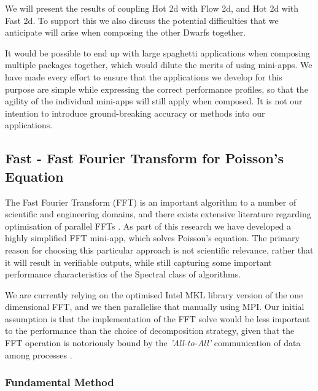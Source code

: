\documentclass[runningheads,a4paper]{llncs}
\begin{document}
We will present the results of coupling Hot 2d with Flow 2d, and Hot 2d with Fast 2d. To support this we also discuss the potential difficulties that we anticipate will arise when composing the other Dwarfs together. 

It would be possible to end up with large spaghetti applications when composing multiple packages together, which would dilute the merits of using mini-apps. We have made every effort to ensure that the applications we develop for this purpose are simple while expressing the correct performance profiles, so that the agility of the individual mini-apps will still apply when composed. It is not our intention to introduce ground-breaking accuracy or methods into our applications.

\subsection{Fast - Fast Fourier Transform for Poisson's Equation}

\label{sec:fast}

The Fast Fourier Transform (FFT) is an important algorithm to a number of scientific and engineering domains, and there exists extensive literature regarding optimisation of parallel FFTs \cite{Swarztrauber1987} \cite{Takahashi2009}. As part of this research we have developed a highly simplified FFT mini-app, which solves Poisson's equation. The primary reason for choosing this particular approach is not scientific relevance, rather that it will result in verifiable outputs, while still capturing some important performance characteristics of the Spectral class of algorithms.

We are currently relying on the optimised Intel MKL library version of the one dimensional FFT, and we then parallelise that manually using MPI. Our initial assumption is that the implementation of the FFT solve would be less important to the performance than the choice of decomposition strategy, given that the FFT operation is notoriously bound by the \textit{'All-to-All'} communication of data among processes \cite{Takahashi2009}.


\subsubsection{Fundamental Method}
\end{document}
